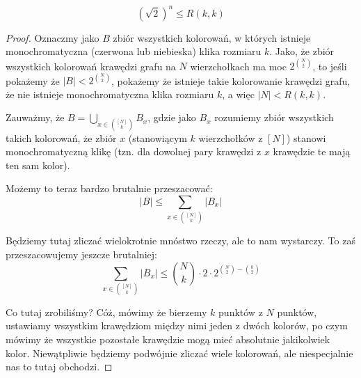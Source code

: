 \begin{theorem}
	\begin{equation}
		(\sqrt{2})^{n} \leq R(k,k)
	\end{equation}
\end{theorem}

\begin{proof}
	Oznaczmy jako $B$ zbiór wszystkich kolorowań, w których istnieje monochromatyczna (czerwona lub niebieska) klika rozmiaru $k$. Jako, że zbiór wszystkich kolorowań krawędzi grafu na $N$ wierzchołkach ma moc $2^{\binom{N}{2}}$, to jeśli pokażemy że $|B| < 2^{\binom{N}{2}}$, pokażemy że istnieje takie kolorowanie krawędzi grafu, że nie istnieje monochromatyczna klika rozmiaru $k$, a więc $|N| < R(k,k)$.

	Zauważmy, że $ B = \bigcup_{x \in \binom{[N]}{k}} B_x $, gdzie jako $B_x$ rozumiemy zbiór wszystkich takich kolorowań, że zbiór $x$ (stanowiącym $k$ wierzchołków z $[N]$) stanowi monochromatyczną klikę (tzn. dla dowolnej pary krawędzi z $x$ krawędzie te mają ten sam kolor).

	Możemy to teraz bardzo brutalnie przeszacować:
	\begin{equation*}
		|B| \leq \sum_{x \in \binom{[N]}{k}} |B_x|
	\end{equation*}

	Będziemy tutaj zliczać wielokrotnie mnóstwo rzeczy, ale to nam wystarczy. To zaś przeszacowujemy jeszcze brutalniej:
	\begin{equation*}
		\sum_{x \in \binom{[N]}{k}} |B_x| \leq \binom{N}{k} \cdot 2 \cdot 2^{\binom{N}{2} - \binom{k}{2}}
	\end{equation*}

	Co tutaj zrobiliśmy? Cóż, mówimy że bierzemy $k$ punktów z $N$ punktów, ustawiamy wszystkim krawędziom między nimi jeden z dwóch kolorów, po czym mówimy że wszystkie pozostałe krawędzie mogą mieć absolutnie jakikolwiek kolor. Niewątpliwie będziemy podwójnie zliczać wiele kolorowań, ale niespecjalnie nas to tutaj obchodzi.


\end{proof}
